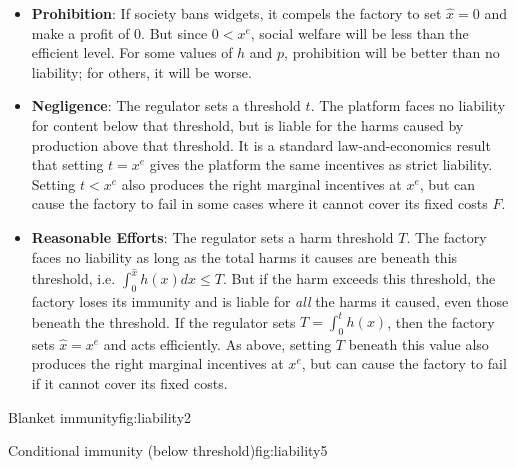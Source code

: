 \begin{itemize}
\item \textbf{Prohibition}: If society bans widgets, it compels the factory to set $\hat{x} = 0$ and make a profit of $0$. But since $0 < x^e$, social welfare will be less than the efficient level. For some values of $h$ and $p$, prohibition will be better than no liability; for others, it will be worse.
\item \textbf{Negligence}: The regulator sets a threshold $t$. The platform faces no liability for content below that threshold, but is liable for the harms caused by production above that threshold. It is a standard law-and-economics result that setting $t = x^e$ gives the platform the same incentives as strict liability. Setting $t < x^e$ also produces the right marginal incentives at $x^e$, but can cause the factory to fail in some cases where it cannot cover its fixed costs $F$.
\item \textbf{Reasonable Efforts}: The regulator sets a harm threshold $T$. The factory faces no liability as long as the total harms it causes are beneath this threshold, i.e. $\int_0^{\hat{x}} h(x) dx \le T$. But if the harm exceeds this threshold, the factory loses its immunity and is liable for \emph{all} the harms it caused, even those beneath the threshold. If the regulator sets $T = \int_0^{t} h(x)$, then the factory sets $\hat{x} = x^e$ and acts efficiently. As above, setting $T$ beneath this value also produces the right marginal incentives at $x^e$, but can cause the factory to fail if it cannot cover its fixed costs.
\end{itemize}


\begin{econ}{Blanket immunity}{fig:liability2}
\end{econ}




\begin{econ}{Conditional immunity (below threshold)}{fig:liability5}
\end{econ}

